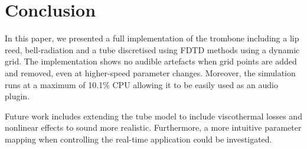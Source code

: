 \section{Conclusion}\label{sec:conclusion}
In this paper, we presented a full implementation of the trombone including a lip reed, bell-radiation and a tube discretised using FDTD methods using a dynamic grid. The implementation shows no audible artefacts when grid points are added and removed, even at higher-speed parameter changes. Moreover, the simulation runs at a maximum of 10.1\% CPU allowing it to be easily used as an audio plugin. 

Future work includes extending the tube model to include viscothermal losses and nonlinear effects to sound more realistic. Furthermore, a more intuitive parameter mapping when controlling the real-time application could be investigated.